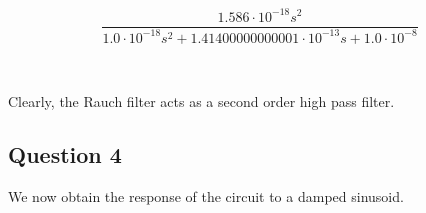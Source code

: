 \documentclass[10pt,notitlepage,onecolumn,aps,pra]{revtex4-1}
\begin{document}
    $$\frac{1.586 \cdot 10^{-18} s^{2}}{1.0 \cdot 10^{-18} s^{2} + 1.41400000000001 \cdot 10^{-13} s + 1.0 \cdot 10^{-8}}$$

    
    \begin{center}
    \end{center}
    { \hspace*{\fill} \\}
    
    Clearly, the Rauch filter acts as a second order high pass filter.

\hypertarget{question-4}{%
\subsection{Question 4}\label{question-4}}

We now obtain the response of the circuit to a damped sinusoid.
\end{document}
